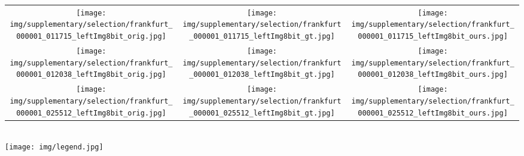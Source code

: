 \documentclass[runningheads]{llncs}
\newcommand{\ours}{DriveSegment\xspace}
\begin{document}
\begin{figure*}[t!]
\begin{minipage}[t]{\columnwidth}
\begin{tabular}{c@{}c@{}c}
         \vspace{-3pt}
         \texttt{[image: img/supplementary/selection/frankfurt\_000001\_011715\_leftImg8bit\_orig.jpg]} &
         \texttt{[image: img/supplementary/selection/frankfurt\_000001\_011715\_leftImg8bit\_gt.jpg]} &
         \texttt{[image: img/supplementary/selection/frankfurt\_000001\_011715\_leftImg8bit\_ours.jpg]} \\
         \vspace{-3pt}
         \texttt{[image: img/supplementary/selection/frankfurt\_000001\_012038\_leftImg8bit\_orig.jpg]} &
         \texttt{[image: img/supplementary/selection/frankfurt\_000001\_012038\_leftImg8bit\_gt.jpg]} &
         \texttt{[image: img/supplementary/selection/frankfurt\_000001\_012038\_leftImg8bit\_ours.jpg]} \\
         \vspace{-3pt}
         \texttt{[image: img/supplementary/selection/frankfurt\_000001\_025512\_leftImg8bit\_orig.jpg]} &
         \texttt{[image: img/supplementary/selection/frankfurt\_000001\_025512\_leftImg8bit\_gt.jpg]} &
         \texttt{[image: img/supplementary/selection/frankfurt\_000001\_025512\_leftImg8bit\_ours.jpg]} \\
         \end{tabular}
    \end{minipage}\\
    \texttt{[image: img/legend.jpg]}
    \vspace*{-2ex}
    \caption{
    \textbf{Qualitative results for unsupervised semantic segmentation using our \ours approach on the validation split of the Cityscapes dataset.} The matching
between our pseudo-classes and the set of ground-truth classes is obtained using the Hungarian algorithm.
    }
    \label{fig:qualitative_supp2}
    \vspace{-1ex}
\end{figure*}
\end{document}
